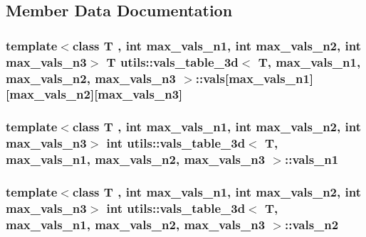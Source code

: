 \subsection{Member Data Documentation}
\hypertarget{structutils_1_1vals__table__3d_a5114626cc52e3fa8adc99cb8f3252f7c}{
\subsubsection[{vals}]{\setlength{\rightskip}{0pt plus 5cm}template$<$class T , int max\-\_\-vals\-\_\-n1, int max\-\_\-vals\-\_\-n2, int max\-\_\-vals\-\_\-n3$>$ T {\bf utils\-::vals\-\_\-table\-\_\-3d}$<$ T, max\-\_\-vals\-\_\-n1, max\-\_\-vals\-\_\-n2, max\-\_\-vals\-\_\-n3 $>$\-::vals\mbox{[}max\-\_\-vals\-\_\-n1\mbox{]}\mbox{[}max\-\_\-vals\-\_\-n2\mbox{]}\mbox{[}max\-\_\-vals\-\_\-n3\mbox{]}}}\label{structutils_1_1vals__table__3d_a5114626cc52e3fa8adc99cb8f3252f7c}
\hypertarget{structutils_1_1vals__table__3d_ac51dcb829cf07eb6cb5c9aa6cb878925}{
\subsubsection[{vals\-\_\-n1}]{\setlength{\rightskip}{0pt plus 5cm}template$<$class T , int max\-\_\-vals\-\_\-n1, int max\-\_\-vals\-\_\-n2, int max\-\_\-vals\-\_\-n3$>$ {\bf int} {\bf utils\-::vals\-\_\-table\-\_\-3d}$<$ T, max\-\_\-vals\-\_\-n1, max\-\_\-vals\-\_\-n2, max\-\_\-vals\-\_\-n3 $>$\-::vals\-\_\-n1}}\label{structutils_1_1vals__table__3d_ac51dcb829cf07eb6cb5c9aa6cb878925}
\hypertarget{structutils_1_1vals__table__3d_a89e720206303e156855e120887633814}{
\subsubsection[{vals\-\_\-n2}]{\setlength{\rightskip}{0pt plus 5cm}template$<$class T , int max\-\_\-vals\-\_\-n1, int max\-\_\-vals\-\_\-n2, int max\-\_\-vals\-\_\-n3$>$ {\bf int} {\bf utils\-::vals\-\_\-table\-\_\-3d}$<$ T, max\-\_\-vals\-\_\-n1, max\-\_\-vals\-\_\-n2, max\-\_\-vals\-\_\-n3 $>$\-::vals\-\_\-n2}}\label{structutils_1_1vals__table__3d_a89e720206303e156855e120887633814}
